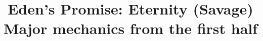 \documentclass{report}
\begin{document}
\title{Eden's Promise: Eternity (Savage)\\Major mechanics from the first half}
\author{}
\maketitle
\tableofcontents

\newcommand{\sectionbreak}{\clearpage}





\end{document}

